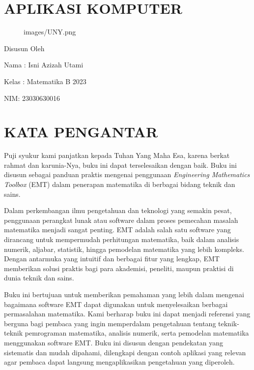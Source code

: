 \documentclass[
]{book}
\author{}
\date{}
\makeatletter
\newcommand*\pandocbounded[1]{%
  \sbox\pandoc@box{#1}%
  \Gscale@div\@tempa{\textheight}{\dimexpr\ht\pandoc@box+\dp\pandoc@box\relax}%
  \Gscale@div\@tempb{\linewidth}{\wd\pandoc@box}%
  \ifdim\@tempb\p@<\@tempa\p@\let\@tempa\@tempb\fi%
  \ifdim\@tempa\p@<\p@\scalebox{\@tempa}{\usebox\pandoc@box}%
  \else\usebox{\pandoc@box}%
  \fi%
}
\makeatother
\begin{document}
\frontmatter

\mainmatter
\chapter{APLIKASI KOMPUTER}\label{aplikasi-komputer}

\begin{figure}
\centering
\pandocbounded{\texttt{[image: images/UNY.png]}}
\caption{images/UNY.png}
\end{figure}

Disusun Oleh

Nama : Isni Azizah Utami

Kelas : Matematika B 2023

NIM: 23030630016

\chapter{KATA PENGANTAR}\label{kata-pengantar}

Puji syukur kami panjatkan kepada Tuhan Yang Maha Esa, karena berkat rahmat dan karunia-Nya, buku ini dapat terselesaikan dengan baik. Buku ini disusun sebagai panduan praktis mengenai penggunaan \emph{Engineering Mathematics Toolbox} (EMT) dalam penerapan matematika di berbagai bidang teknik dan sains.

Dalam perkembangan ilmu pengetahuan dan teknologi yang semakin pesat, penggunaan perangkat lunak atau software dalam proses pemecahan masalah matematika menjadi sangat penting. EMT adalah salah satu software yang dirancang untuk mempermudah perhitungan matematika, baik dalam analisis numerik, aljabar, statistik, hingga pemodelan matematika yang lebih kompleks. Dengan antarmuka yang intuitif dan berbagai fitur yang lengkap, EMT memberikan solusi praktis bagi para akademisi, peneliti, maupun praktisi di dunia teknik dan sains.

Buku ini bertujuan untuk memberikan pemahaman yang lebih dalam mengenai bagaimana software EMT dapat digunakan untuk menyelesaikan berbagai permasalahan matematika. Kami berharap buku ini dapat menjadi referensi yang berguna bagi pembaca yang ingin memperdalam pengetahuan tentang teknik-teknik pemrograman matematika, analisis numerik, serta pemodelan matematika menggunakan software EMT. Buku ini disusun dengan pendekatan yang sistematis dan mudah dipahami, dilengkapi dengan contoh aplikasi yang relevan agar pembaca dapat langsung mengaplikasikan pengetahuan yang diperoleh.
\end{document}
